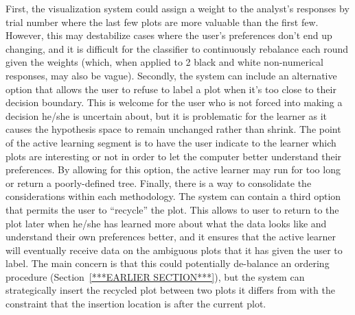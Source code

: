 First, the visualization system could assign a weight to the analyst's responses by trial number where the last few plots are more valuable than the first few. However, this may destabilize cases where the user's preferences don’t end up changing, and it is difficult for the classifier to continuously rebalance each round given the weights (which, when applied to 2 black and white non-numerical responses, may also be vague). Secondly, the system can include an alternative option that allows the user to refuse to label a plot when it's too close to their decision boundary. This is welcome for the user who is not forced into making a decision he/she is uncertain about, but it is problematic for the learner as it causes the hypothesis space to remain unchanged rather than shrink. The point of the active learning segment is to have the user indicate to the learner which plots are interesting or not in order to let the computer better understand their preferences. By allowing for this option, the active learner may run for too long or return a poorly-defined tree. Finally, there is a way to consolidate the considerations within each methodology. The system can contain a third option that permits the user to ``recycle'' the plot. This allows to user to return to the plot later when he/she has learned more about what the data looks like and understand their own preferences better, and it ensures that the active learner will eventually receive data on the ambiguous plots that it has given the user to label. The main concern is that this could potentially de-balance an ordering procedure (Section~\ref{***EARLIER SECTION***}), but the system can strategically insert the recycled plot between two plots it differs from with the constraint that the insertion location is after the current plot.